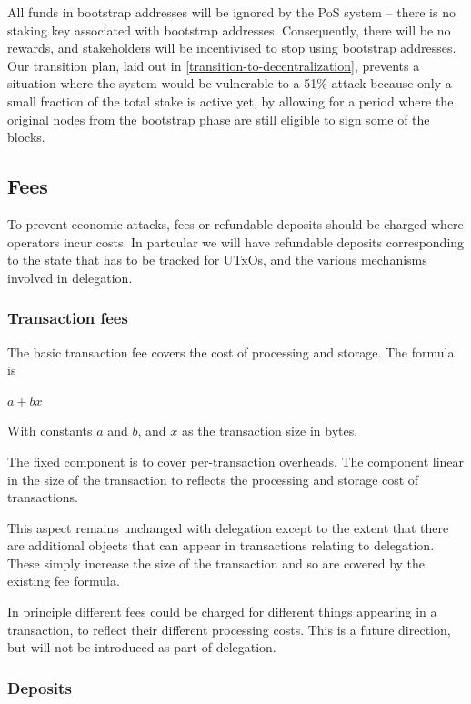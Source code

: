 \documentclass[11pt,a4paper]{article}
\begin{document}
All funds in bootstrap addresses will be ignored by the PoS system --
there is no staking key associated with bootstrap
addresses. Consequently, there will be no rewards, and stakeholders
will be incentivised to stop using bootstrap addresses. Our transition
plan, laid out in \cref{transition-to-decentralization}, prevents a
situation where the system would be vulnerable to a 51\% attack
because only a small fraction of the total stake is active yet, by
allowing for a period where the original nodes from the bootstrap
phase are still eligible to sign some of the blocks.

\subsection{Fees}
\label{fees}

To prevent economic attacks, fees or refundable deposits should be
charged where operators incur costs. In partcular we will have
refundable deposits corresponding to the state that has to be tracked
for UTxOs, and the various mechanisms involved in delegation.

\subsubsection{Transaction fees}
\label{transaction-fees}

The basic transaction fee covers the cost of processing and storage. The
formula is

\(a + b x\)

With constants \(a\) and \(b\), and \(x\) as the transaction size in
bytes.

The fixed component is to cover per-transaction overheads. The component
linear in the size of the transaction to reflects the processing and
storage cost of transactions.

This aspect remains unchanged with delegation except to the extent that
there are additional objects that can appear in transactions relating to
delegation. These simply increase the size of the transaction and so are
covered by the existing fee formula.

In principle different fees could be charged for different things
appearing in a transaction, to reflect their different processing costs.
This is a future direction, but will not be introduced as part of
delegation.

\subsubsection{Deposits}
\label{fees-deposits}
\end{document}
